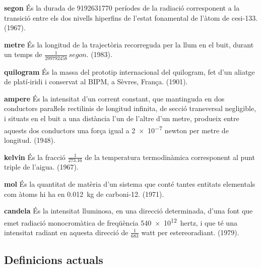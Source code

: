 \begin{list}{}
   {\setlength{\labelwidth}{22mm} \setlength{\leftmargin}{22mm} \setlength{\labelsep}{2mm}}
   \item[\textbf{segon}] És la durada de \num{9192631770} períodes de la
   radiació corresponent a la transició entre els dos nivells
  hiperfins de l'estat fonamental de l'àtom de cesi-133. (1967).
   \item[\textbf{metre}] És la longitud de la trajectòria recorreguda per la llum
   en el buit, durant un temps de $\frac{1}{\num{299792458}}\si{\,segon}$. (1983).
   \item[\textbf{quilogram}] És la massa del prototip internacional del quilogram, fet d'un aliatge de platí-iridi i
    conservat al BIPM, a Sèvres, França. (1901).
   \item[\textbf{ampere}] És la intensitat d'un corrent constant,
   que mantinguda en dos conductors paraŀlels rectilinis de longitud
   infinita, de secció transversal negligible, i situats en el buit a una
   distància l'un de l'altre d'un metre, produeix entre
   aquests dos conductors  una força igual a \num{2e-7} newton per metre de longitud. (1948).
   \item[\textbf{kelvin}] És la fracció $\frac{1}{\num{273,16}}$ de la temperatura
   termodinàmica corresponent al punt triple de l'aigua. (1967).
   \item[\textbf{mol}] És la quantitat de matèria d'un sistema que conté tantes
   entitats elementals com àtoms hi ha en \SI{0,012}{kg} de carboni-12. (1971).
   \item[\textbf{candela}] És la intensitat lluminosa, en una direcció determinada,
   d'una font que emet radiació monocromàtica de freqüència \SI{540e12}{hertz}, i
   que té una intensitat radiant en aquesta direcció de $\frac{1}{683}$ watt per estereoradiant. (1979).
\end{list}

\subsection{Definicions actuals}

